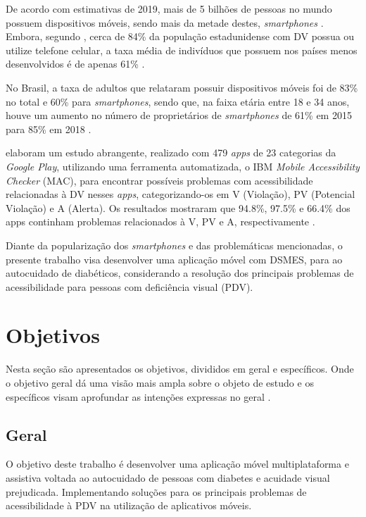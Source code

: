 De acordo com estimativas de 2019, mais de 5 bilhões de pessoas no mundo possuem dispositivos móveis, sendo mais da metade destes, \textit{smartphones}
\cite{Taylor2019}. Embora, segundo , cerca de 84\% da população estadunidense com DV possua ou utilize telefone celular,
a taxa média de indivíduos que possuem nos países menos desenvolvidos é de apenas 61\% \cite{ITU_2021}.

No Brasil, a taxa de adultos que relataram possuir dispositivos móveis foi de 83\% no total e 60\% para \textit{smartphones},
sendo que, na faixa etária entre 18 e 34 anos, houve um aumento no número de proprietários de \textit{smartphones} de
61\% em 2015 para 85\% em 2018 \cite{Taylor2019}.

 elaboram um estudo abrangente, realizado com 479 \textit{apps} de 23 categorias da
\emph{Google Play}, utilizando uma ferramenta automatizada, o IBM \textit{Mobile Accessibility Checker}
(MAC), para encontrar possíveis problemas com acessibilidade relacionadas à DV nesses \textit{apps},
categorizando-os em V (Violação), PV (Potencial Violação) e A (Alerta). Os resultados mostraram que 94.8\%, 97.5\% e 66.4\% dos apps continham problemas
relacionados à V, PV e A, respectivamente \cite{Yan2019}.

Diante da popularização dos \emph{smartphones} e das problemáticas mencionadas, o presente trabalho visa desenvolver uma aplicação móvel
com DSMES, para ao autocuidado de diabéticos, considerando a resolução dos principais problemas de acessibilidade para pessoas com
deficiência visual (PDV).

\section{Objetivos}

Nesta seção são apresentados os objetivos, divididos em geral e específicos. Onde o objetivo geral dá uma visão mais ampla sobre o objeto
de estudo e os específicos visam aprofundar as intenções expressas no geral \cite{cervo2006metodologia}.

\subsection{Geral}

O objetivo deste trabalho é desenvolver uma aplicação móvel multiplataforma e assistiva voltada ao autocuidado de pessoas com diabetes
e acuidade visual prejudicada. Implementando soluções para os principais problemas de acessibilidade à PDV na utilização de aplicativos móveis.

